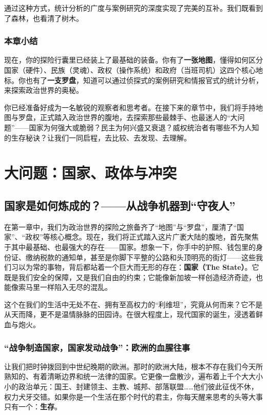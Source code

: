 \documentclass[a5paper, 11pt, openany]{ctexbook}
\begin{document}
通过这种方式，统计分析的广度与案例研究的深度实现了完美的互补。我们既看到了森林，也看清了树木。

\section*{本章小结}

现在，你的探险行囊里已经装上了最基础的装备。你有了\textbf{一张地图}，懂得如何区分国家（硬件）、民族（灵魂）、政权（操作系统）和政府（当班司机）这四个核心地标。你也有了\textbf{一支罗盘}，知道可以通过侦探式的案例研究和情报官式的统计分析，来探索政治世界的奥秘。

你已经准备好成为一名敏锐的观察者和思考者。在接下来的章节中，我们将手持地图与罗盘，正式踏入政治世界的腹地，去探索那些最棘手、也最迷人的“大问题”——国家为何强大或脆弱？民主为何兴盛又衰退？威权统治者有哪些不为人知的生存秘诀？让我们一同启程，去比较、去发现、去理解。

\part{大问题：国家、政体与冲突}

\chapter{国家是如何炼成的？——从战争机器到“守夜人”}

在第一章中，我们为政治世界的探险之旅备齐了“地图”与“罗盘”，厘清了“国家”、“政权”等核心概念。现在，我们将正式踏入这片广袤大陆的腹地，首先聚焦于其中最基础、也最强大的存在——国家。想象一下，你手中的护照、钱包里的身份证、缴纳税款的通知单，甚至是你脚下平整的公路和头顶明亮的街灯——这些我们习以为常的事物，背后都站着一个巨大而无形的存在：\textbf{国家（The State）}。它既是我们安全的保障，又是我们自由的约束；它能像新加坡一样创造经济奇迹，也能像索马里一样陷入无尽的混乱。

这个在我们的生活中无处不在、拥有至高权力的“利维坦”，究竟从何而来？它不是从天而降，更不是温情脉脉的田园诗。在很大程度上，现代国家的诞生，浸透着鲜血与炮火。

\section{“战争制造国家，国家发动战争”：欧洲的血腥往事}

让我们把时钟拨回到中世纪晚期的欧洲。那时的欧洲大陆，根本不存在我们今天所熟知的、有着清晰边界和统一法律的国家。它更像一盘散沙，遍布着上千个大大小小的政治单元：国王、封建领主、主教、城邦、部落联盟……他们彼此征伐不休，权力犬牙交错。如果你是一个生活在那个时代的君主，你每天醒来思考的头等大事只有一个：\textbf{生存}。
\end{document}
